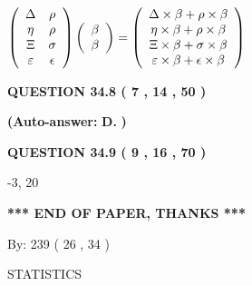 \documentclass[12pt]{article}
\begin{document}
$  %
 \left( \begin{array}
 {
 c
 c
 }
 \Delta & 
 \rho \\ 
 \eta & 
 \rho \\ 
                    \Xi & 
 \sigma \\ 
 \varepsilon & 
 \epsilon
 \end{array} \right)
 \left( \begin{array}
 {
 c
 }
 \beta \\ 
 \beta
 \end{array} \right)
=
 \left( \begin{array}
 {
 c
 }
  \Delta \times  \beta +  \rho \times  \beta \\ 
  \eta \times  \beta +  \rho \times  \beta \\ 
                     \Xi \times  \beta +  \sigma \times  \beta \\ 
  \varepsilon \times  \beta +  \epsilon \times  \beta
 \end{array} \right)
$
 
  
  
{\textbf{\large{QUESTION
34.8 
 (           7 ,          14 ,          50 )
}}}
 
 
{\textbf{(Auto-answer:}}
{\textbf{\large{
D.}}}
{\textbf{)}}
 
 
  
  
{\textbf{\large{QUESTION
34.9 
 (           9 ,          16 ,          70 )
}}}

-3,  %
20
 
   
   
   
   
\vspace{1.0in} 
{\textbf{\large{ *** END OF PAPER, THANKS *** }}} 
   
   
\hspace{1.0in} By: 
         239 (          26 ,           34 )
   
   
   
\vspace{0.2in}
\vspace{0.2in}
   
   
 \newpage
\setcounter{page}{1} 
   
   
 {\LARGE{STATISTICS}}
   
\vspace{0.2in}
   
\end{document}

